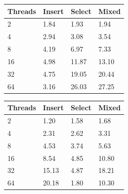 \documentclass[conference, compsoc]{IEEEtran}
\begin{document}
\par\vspace{\baselineskip}
\begin{figure}[H]
\begin{center}
 \label{tab:omdbScaling}
  \begin{tabular}{  l  l  l  l }
    \midrule
    \bf Threads & \bf Insert & \bf Select & \bf Mixed \\ \midrule
     2 & 1.84 & 1.93 & 1.94 \\ \midrule
     4 & 2.94 & 3.08 & 3.54 \\ \midrule
     8 & 4.19 & 6.97 & 7.33 \\ \midrule
     16 & 4.98 & 11.87 & 13.10 \\ \midrule
     32 & 4.75 & 19.05 & 20.44 \\ \midrule
     64 & 3.16 & 26.03 & 27.25 \\ \midrule
  \end{tabular}
\end{center}
\end{figure}

\par\vspace{\baselineskip}
\begin{figure}[H]
\begin{center}
 \label{tab:memsqlScaling}
  \begin{tabular}{  l  l  l  l }
    \midrule
    \bf Threads & \bf Insert & \bf Select & \bf Mixed \\ \midrule
     2 & 1.20 & 1.58 & 1.68 \\ \midrule
     4 & 2.31 & 2.62 & 3.31 \\ \midrule
     8 & 4.53 & 3.74 & 5.63 \\ \midrule
     16 & 8.54 & 4.85 & 10.80 \\ \midrule
     32 & 15.13 & 4.87 & 18.21 \\ \midrule
     64 & 20.18 & 1.80 & 10.30 \\ \midrule
  \end{tabular}
\end{center}
\end{figure}
\end{document}
